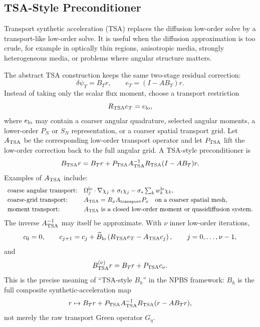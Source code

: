 \documentclass[11pt]{article}
\begin{document}
\subsection{TSA-Style Preconditioner}

Transport synthetic acceleration (TSA) replaces the diffusion low-order solve
by a transport-like low-order solve.  It is useful when the diffusion
approximation is too crude, for example in optically thin regions, anisotropic
media, strongly heterogeneous media, or problems where angular structure
matters.

The abstract TSA construction keeps the same two-stage residual correction:
\[
  \delta\psi_T = B_T r,\qquad
  e_T=(I-AB_T)r.
\]
Instead of taking only the scalar flux moment, choose a transport restriction
\[
  R_{\rm TSA}e_T = e_{\rm lo},
\]
where \(e_{\rm lo}\) may contain a coarser angular quadrature, selected angular
moments, a lower-order \(P_N\) or \(S_N\) representation, or a coarser spatial
transport grid.  Let \(A_{\rm TSA}\) be the corresponding low-order transport
operator and let \(P_{\rm TSA}\) lift the low-order correction back to the
full angular grid.  A TSA-style preconditioner is
\[
  B_{\rm TSA}r
  =
  B_T r
  +
  P_{\rm TSA}A_{\rm TSA}^{-1}R_{\rm TSA}(I-AB_T)r .
\]
Examples of \(A_{\rm TSA}\) include:
\[
\begin{array}{ll}
\text{coarse angular transport:}
&
  \Omega_j^{\rm lo}\cdot\nabla \chi_j
  +\sigma_t\chi_j
  -\sigma_s\sum_k w_k^{\rm lo}\chi_k,
\\[1mm]
\text{coarse-grid transport:}
&
  A_{\rm TSA}=R_x A_{\rm transport} P_x
  \quad\text{on a coarser spatial mesh},
\\[1mm]
\text{moment transport:}
&
  A_{\rm TSA}\text{ is a closed low-order moment or quasidiffusion system}.
\end{array}
\]
The inverse \(A_{\rm TSA}^{-1}\) may itself be approximate.  With \(\nu\)
inner low-order iterations,
\[
  c_0=0,\qquad
  c_{j+1}=c_j+\widetilde B_{\rm lo}
  \left(R_{\rm TSA}e_T-A_{\rm TSA}c_j\right),
  \qquad j=0,\ldots,\nu-1,
\]
and
\[
  B_{\rm TSA}^{(\nu)}r = B_T r + P_{\rm TSA}c_\nu .
\]
This is the precise meaning of ``TSA-style \(B_h\)'' in the NPBS framework:
\(B_h\) is the full composite synthetic-acceleration map
\[
  r
  \mapsto
  B_T r
  +
  P_{\rm TSA}A_{\rm TSA}^{-1}R_{\rm TSA}(r-AB_T r),
\]
not merely the raw transport Green operator \(G_\eta\).
\end{document}
